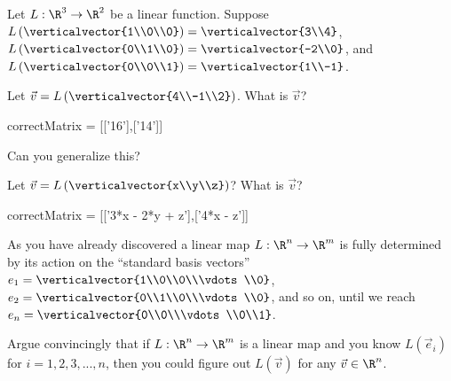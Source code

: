 \documentclass{ximera}
\begin{document}
\begin{question}
  Let $L:\R^3 \to \R^2$ be a linear function.  Suppose
  $L\left(\verticalvector{1\\0\\0}\right) = \verticalvector{3\\4}$,
  $L\left(\verticalvector{0\\1\\0}\right) = \verticalvector{-2\\0}$,
  and $L\left(\verticalvector{0\\0\\1}\right) =
  \verticalvector{1\\-1}$.
  
  \begin{solution}
    Let $\vec{v} = L \left(\verticalvector{4\\-1\\2}\right)$.  What is $\vec{v}$?

    \begin{matrix-answer}[name=v]
      correctMatrix = [['16'],['14']]
    \end{matrix-answer}
    
  \end{solution}

  Can you generalize this?

  \begin{solution}
    Let $\vec{v} = L\left(\verticalvector{x\\y\\z}\right)$?  What is $\vec{v}$?

    \begin{matrix-answer}[name=v]
      correctMatrix = [['3*x - 2*y + z'],['4*x - z']]
    \end{matrix-answer}
    
  \end{solution}

  As you have already discovered a linear map $L: \R^n \to \R^m$ is
  fully determined by its action on the ``standard basis vectors''
  $e_1 = \verticalvector{1\\0\\0\\\vdots\\0}$, $e_2 =
  \verticalvector{0\\1\\0\\\vdots\\0}$, and so on, until we reach $e_n
  = \verticalvector{0\\0\\\vdots\\0\\1}$.

  Argue convincingly that if $L:\R^n \to\R^m$ is a linear map and you know $L(\vec{e}_i)$ for $i=1,2,3,...,n$, then you could figure out $L(\vec{v})$ for
  any $\vec{v} \in \R^n$.
  \begin{free-response}
  \end{free-response}
\end{question}
\end{document}
